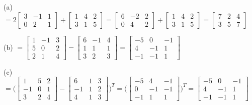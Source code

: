 \documentclass[addpoints]{exam}
\begin{document}
\begin{sloppypar}
\begin{questions}
\begin{solution}
        (a) $ = 2\begin{bmatrix}
            3 & -1 & 1 \\ 0 & 2 & 1
        \end{bmatrix} + \begin{bmatrix}
            1 & 4 & 2 \\ 3 & 1 & 5
        \end{bmatrix} = \begin{bmatrix}
            6 & -2 & 2 \\ 0 & 4 & 2
        \end{bmatrix} + \begin{bmatrix}
            1 & 4 & 2 \\ 3 & 1 & 5
        \end{bmatrix} = \begin{bmatrix}
            7 & 2 & 4 \\ 3 & 5 & 7
        \end{bmatrix} $

        (b) $ = \begin{bmatrix}
            1 & -1 & 3 \\ 5 & 0 & 2 \\ 2 & 1 & 4
        \end{bmatrix} - \begin{bmatrix}
            6 & -1 & 4 \\ 1 & 1 & 1 \\ 3 & 2 & 3
        \end{bmatrix} = \begin{bmatrix}
            -5 & 0 & -1 \\ 4 & -1 & 1 \\ -1 & -1 & 1
        \end{bmatrix}$

        (c) $ = \Biggl(\begin{bmatrix}
            1 & 5 & 2 \\ -1 &  0 & 1 \\ 3 & 2 & 4
        \end{bmatrix} - \begin{bmatrix}
            6 & 1 & 3 \\ -1 & 1 & 2 \\ 4 & 1 & 3
        \end{bmatrix}\Biggr)^T = \Biggl( \begin{bmatrix}
            -5 & 4 & -1 \\ 0 & -1 & -1 \\ -1 & 1 & 1
        \end{bmatrix} \Biggr)^T = \begin{bmatrix}
            -5 & 0 & -1 \\ 4 & -1 & 1 \\ -1 & -1 & 1
        \end{bmatrix} $


\end{solution}
\end{questions}
\end{sloppypar}
\end{document}
